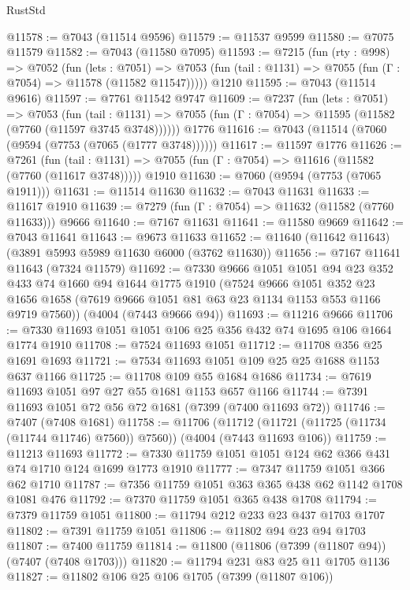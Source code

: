 \begin{lexlean}{RustStd}
\begin{coremodule}
@11578 := @7043 (@11514 @9596)
@11579 := @11537 @9599
@11580 := @7075 @11579
@11582 := @7043 (@11580 @7095)
@11593 := @7215
    (fun (rty : @998) =>
    @7052
      (fun (lets : @7051) =>
      @7053 (fun (tail : @1131) => @7055 (fun (Γ : @7054) => @11578 (@11582 @11547)))))
    @1210
@11595 := @7043 (@11514 @9616)
@11597 := @7761 @11542 @9747
@11609 := @7237
    (fun (lets : @7051) =>
    @7053
      (fun (tail : @1131) =>
      @7055 (fun (Γ : @7054) => @11595 (@11582 (@7760 (@11597 @3745 @3748))))))
    @1776
@11616 := @7043 (@11514 (@7060 (@9594 (@7753 (@7065 (@1777 @3748))))))
@11617 := @11597 @1776
@11626 := @7261
    (fun (tail : @1131) => @7055 (fun (Γ : @7054) => @11616 (@11582 (@7760 (@11617 @3748)))))
    @1910
@11630 := @7060 (@9594 (@7753 (@7065 @1911)))
@11631 := @11514 @11630
@11632 := @7043 @11631
@11633 := @11617 @1910
@11639 := @7279 (fun (Γ : @7054) => @11632 (@11582 (@7760 @11633))) @9666
@11640 := @7167 @11631
@11641 := @11580 @9669
@11642 := @7043 @11641
@11643 := @9673 @11633
@11652 := @11640 (@11642 @11643) (@3891 @5993 @5989 @11630 @6000 (@3762 @11630))
@11656 := @7167 @11641 @11643 (@7324 @11579)
@11692 := @7330
    @9666
    @1051
    @1051
    @94
    @23
    @352
    @433
    @74
    @1660
    @94
    @1644
    @1775
    @1910
    (@7524
      @9666
      @1051
      @352
      @23
      @1656
      @1658
      (@7619 @9666 @1051 @81 @63 @23 @1134 @1153 @553 @1166 @9719 @7560))
    (@4004 (@7443 @9666 @94))
@11693 := @11216 @9666
@11706 := @7330 @11693 @1051 @1051 @106 @25 @356 @432 @74 @1695 @106 @1664 @1774 @1910
@11708 := @7524 @11693 @1051
@11712 := @11708 @356 @25 @1691 @1693
@11721 := @7534 @11693 @1051 @109 @25 @25 @1688 @1153 @637 @1166
@11725 := @11708 @109 @55 @1684 @1686
@11734 := @7619 @11693 @1051 @97 @27 @55 @1681 @1153 @657 @1166
@11744 := @7391 @11693 @1051 @72 @56 @72 @1681 (@7399 (@7400 @11693 @72))
@11746 := @7407 (@7408 @1681)
@11758 := @11706
    (@11712 (@11721 (@11725 (@11734 (@11744 @11746) @7560)) @7560))
    (@4004 (@7443 @11693 @106))
@11759 := @11213 @11693
@11772 := @7330 @11759 @1051 @1051 @124 @62 @366 @431 @74 @1710 @124 @1699 @1773 @1910
@11777 := @7347 @11759 @1051 @366 @62 @1710
@11787 := @7356 @11759 @1051 @363 @365 @438 @62 @1142 @1708 @1081 @476
@11792 := @7370 @11759 @1051 @365 @438 @1708
@11794 := @7379 @11759 @1051
@11800 := @11794 @212 @233 @23 @437 @1703 @1707
@11802 := @7391 @11759 @1051
@11806 := @11802 @94 @23 @94 @1703
@11807 := @7400 @11759
@11814 := @11800 (@11806 (@7399 (@11807 @94)) (@7407 (@7408 @1703)))
@11820 := @11794 @231 @83 @25 @11 @1705 @1136
@11827 := @11802 @106 @25 @106 @1705 (@7399 (@11807 @106))

\end{coremodule}
\end{lexlean}
